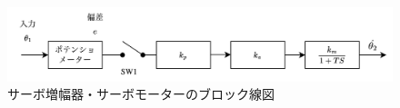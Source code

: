 \begin{figure}
	\centering
	\includegraphics[width=0.8\linewidth]{src/figures/servo-motor/servo-motor.png}
	\caption{サーボ増幅器・サーボモーターのブロック線図}\label{fig:servo-motor}
\end{figure}
